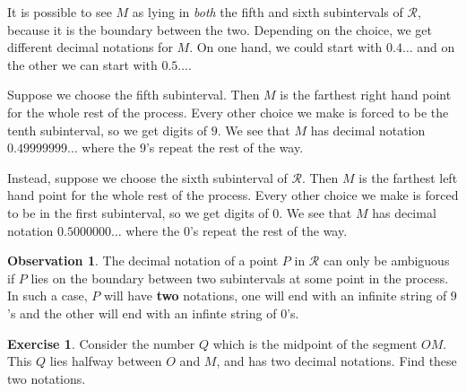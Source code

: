\documentclass[12pt,letterpaper]{article}
\theoremstyle{definition}
\newtheorem{exercise}[question]{Exercise}
\newtheorem*{observation}{Observation}
\begin{document}
It is possible to see $M$ as lying in \emph{both} the fifth and sixth subintervals of $\mathcal{R}$, because it is the boundary between the two.
Depending on the choice, we get different decimal notations for $M$.
On one hand, we could start with $0.4\ldots$ and on the other we can start with $0.5\ldots$.

Suppose we choose the fifth subinterval.
Then $M$ is the farthest right hand point for the whole rest of the process.
Every other choice we make is forced to be the tenth subinterval, so we get digits of $9$.
We see that $M$ has decimal notation $0.49999999\ldots$ where the $9$'s repeat the rest of the way.

Instead, suppose we choose the sixth subinterval of $\mathcal{R}$.
Then $M$ is the farthest left hand point for the whole rest of the process.
Every other choice we make is forced to be in the first subinterval, so we get digits of $0$.
We see that $M$ has decimal notation $0.5000000\ldots$ where the $0$'s repeat the rest of the way.


\begin{observation}
The decimal notation of a point $P$ in $\mathcal{R}$ can only be ambiguous if $P$ lies on the boundary between two subintervals at some point in the process.
In such a case, $P$ will have \textbf{two} notations, one will end with an infinite string of $9$'s and the other will end with an infinte string of $0$'s.
\end{observation}


\begin{exercise}
Consider the number $Q$ which is the midpoint of the segment $OM$.
This $Q$ lies halfway between $O$ and $M$, and has two decimal notations.
Find these two notations.
\end{exercise}



\end{document}
